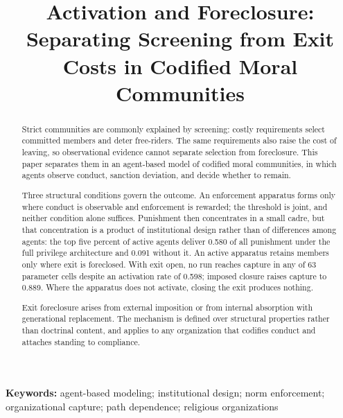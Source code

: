 \documentclass[12pt]{article}
\title{Activation and Foreclosure: Separating Screening from Exit Costs in Codified Moral Communities}
\author{}
\date{}
\date{}
\newcommand{\affiliation}{}
\begin{document}
\maketitle
\vspace{1em}


\begin{abstract}
Strict communities are commonly explained by screening: costly requirements select committed members and deter free-riders. The same requirements also raise the cost of leaving, so observational evidence cannot separate selection from foreclosure. This paper separates them in an agent-based model of codified moral communities, in which agents observe conduct, sanction deviation, and decide whether to remain.

Three structural conditions govern the outcome. An enforcement apparatus forms only where conduct is observable and enforcement is rewarded; the threshold is joint, and neither condition alone suffices. Punishment then concentrates in a small cadre, but that concentration is a product of institutional design rather than of differences among agents: the top five percent of active agents deliver 0.580 of all punishment under the full privilege architecture and 0.091 without it. An active apparatus retains members only where exit is foreclosed. With exit open, no run reaches capture in any of 63 parameter cells despite an activation rate of 0.598; imposed closure raises capture to 0.889. Where the apparatus does not activate, closing the exit produces nothing.

Exit foreclosure arises from external imposition or from internal absorption with generational replacement. The mechanism is defined over structural properties rather than doctrinal content, and applies to any organization that codifies conduct and attaches standing to compliance.
\end{abstract}
\vspace{1em}\noindent\textbf{Keywords:} agent-based modeling; institutional design; norm enforcement; organizational capture; path dependence; religious organizations

\newpage

\end{document}
